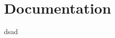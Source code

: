\chapter{Documentation}
\hypertarget{md_README}{}\label{md_README}
\label{md_README_autotoc_md0}%
%
dsad 